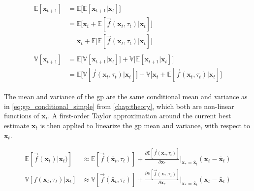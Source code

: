 \begin{subequations}\label{eq:gp_prediction_mean_variance}
    \begin{align}
        \begin{split}
            \mathbb{E}[\boldsymbol{x}_{t+1}] &= \mathbb{E}\big[ \mathbb{E}[\boldsymbol{x}_{t+1} | \boldsymbol{x}_t] \big]\\
            &= \mathbb{E}\big[ \boldsymbol{x}_t + \mathbb{E}[\vec{f}(\boldsymbol{x}_t, \tau_t) | \boldsymbol{x}_t] \big]\\
            & = \bar{\boldsymbol{x}}_t + \mathbb{E}\big[ \mathbb{E}[\vec{f}(\boldsymbol{x}_t, \tau_t) | \boldsymbol{x}_t] \big]
        \end{split} \\
        \begin{split}
            \mathbb{V}[\boldsymbol{x}_{t+1}] &= \mathbb{E}\big[\mathbb{V}[\boldsymbol{x}_{t+1} | \boldsymbol{x}_t]\big] + \mathbb{V}\big[ \mathbb{E}[\boldsymbol{x}_{t+1} | \boldsymbol{x}_t] \big]\\
            &= \mathbb{E}\big[\mathbb{V}[\vec{f}(\boldsymbol{x}_t, \tau_t) | \boldsymbol{x}_t]\big] + \mathbb{V}\big[\boldsymbol{x}_t + \mathbb{E}[\vec{f}(\boldsymbol{x}_t, \tau_t) | \boldsymbol{x}_t] \big]
        \end{split}
    \end{align}
\end{subequations}

The mean and variance of the \acrshort{gp} are the same conditional mean and variance as in \cref{eq:gp_conditional_simple} from \cref{chap:theory}, which both are non-linear functions of $\boldsymbol{x}_t$. A first-order Taylor approximation around the current best estimate $\bar{\boldsymbol{x}}_t$ is then applied to linearize the \acrshort{gp} mean and variance, with respect to $\boldsymbol{x}_t$.

\begin{subequations}\label{eq:gp_predict_taylor_approx}
    \begin{align}
        \mathbb{E}[\vec{f}(\boldsymbol{x}_t) | \boldsymbol{x}_t)]    & \approx \mathbb{E}[\vec{f}(\bar{\boldsymbol{x}}_t, \tau_t)] +  \frac{\partial  \mathbb{E}[\vec{f}(\boldsymbol{x}_*, \tau_t)]}{\partial \boldsymbol{x}_*}\bigg|_{\boldsymbol{x}_* = \bar{\boldsymbol{x}}_t} (\boldsymbol{x}_t - \bar{\boldsymbol{x}}_t) \\
        \mathbb{V}[f(\boldsymbol{x}_{t}, \tau_t) | \boldsymbol{x}_t] & \approx \mathbb{V}[\vec{f}(\bar{\boldsymbol{x}}_t, \tau_t)] +  \frac{\partial \mathbb{V}[\vec{f}(\boldsymbol{x}_*, \tau_t)]}{\partial \boldsymbol{x}_*}\bigg|_{\boldsymbol{x}_* = \bar{\boldsymbol{x}}_t} (\boldsymbol{x}_t - \bar{\boldsymbol{x}}_t)
    \end{align}
\end{subequations}


